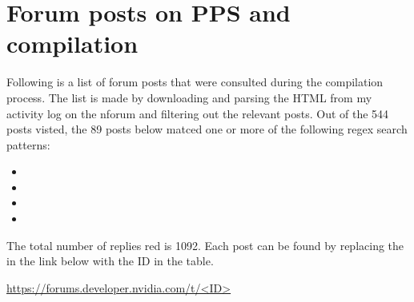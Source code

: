 \chapter{Forum posts on PPS and compilation}

Following is a list of forum posts that were consulted during the compilation process.
The list is made by downloading and parsing the HTML from my activity log on the \gls{nforum} \cite{martensPostsRedEmil} and filtering out the relevant posts.
Out of the 544 posts visted, the 89 posts below matced one or more of the following regex search patterns:
\begin{itemize}
    \item {}
    \item {}
    \item {}
    \item {}
\end{itemize}
The total number of replies red is 1092.
Each post can be found by replacing the  in the link below with the ID in the table.

\url{https://forums.developer.nvidia.com/t/<ID>}

